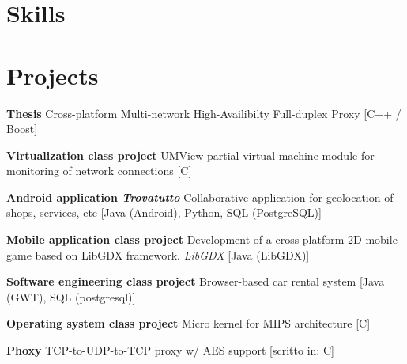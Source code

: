\documentclass[11pt,a4paper,sans]{moderncv} %
\begin{document}



\section{Skills}



\section{Projects}
 {\textbf{Thesis} \newline Cross-platform Multi-network High-Availibilty Full-duplex Proxy [C++ / Boost]}

 {\textbf{Virtualization class project} \newline UMView partial virtual machine module for monitoring of network connections [C]}

 {\textbf{Android application {\em Trovatutto}} \newline Collaborative application for geolocation of shops, services, etc [Java (Android), Python, SQL (PostgreSQL)]}

 {\textbf{Mobile application class project} \newline Development of a cross-platform 2D mobile game based on LibGDX framework. {\em LibGDX} [Java (LibGDX)]}

 {\textbf{Software engineering class project} \newline Browser-based car rental system [Java (GWT), SQL (postgresql)]}

 {\textbf{Operating system class project} \newline Micro kernel for MIPS architecture [C]}

 {\textbf{Phoxy} \newline TCP-to-UDP-to-TCP proxy w/ AES support [scritto in: C]}
\end{document}
